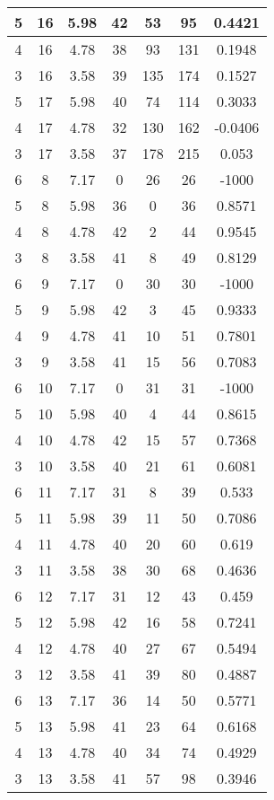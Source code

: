 \documentclass[letterpaper, 12pt]{article}
\begin{document}
\begin{longtable}{|c|c|c|c|c|c|c|}
\hline
5 & 16 & 5.98 & 42 & 53 & 95 & 0.4421 \\
\hline
4 & 16 & 4.78 & 38 & 93 & 131 & 0.1948 \\
\hline
3 & 16 & 3.58 & 39 & 135 & 174 & 0.1527 \\
\hline
5 & 17 & 5.98 & 40 & 74 & 114 & 0.3033 \\
\hline
4 & 17 & 4.78 & 32 & 130 & 162 & -0.0406 \\
\hline
3 & 17 & 3.58 & 37 & 178 & 215 & 0.053 \\
\hline
6 & 8 & 7.17 & 0 & 26 & 26 & -1000 \\
\hline
5 & 8 & 5.98 & 36 & 0 & 36 & 0.8571 \\
\hline
4 & 8 & 4.78 & 42 & 2 & 44 & 0.9545 \\
\hline
3 & 8 & 3.58 & 41 & 8 & 49 & 0.8129 \\
\hline
6 & 9 & 7.17 & 0 & 30 & 30 & -1000 \\
\hline
5 & 9 & 5.98 & 42 & 3 & 45 & 0.9333 \\
\hline
4 & 9 & 4.78 & 41 & 10 & 51 & 0.7801 \\
\hline
3 & 9 & 3.58 & 41 & 15 & 56 & 0.7083 \\
\hline
6 & 10 & 7.17 & 0 & 31 & 31 & -1000 \\
\hline
5 & 10 & 5.98 & 40 & 4 & 44 & 0.8615 \\
\hline
4 & 10 & 4.78 & 42 & 15 & 57 & 0.7368 \\
\hline
3 & 10 & 3.58 & 40 & 21 & 61 & 0.6081 \\
\hline
6 & 11 & 7.17 & 31 & 8 & 39 & 0.533 \\
\hline
5 & 11 & 5.98 & 39 & 11 & 50 & 0.7086 \\
\hline
4 & 11 & 4.78 & 40 & 20 & 60 & 0.619 \\
\hline
3 & 11 & 3.58 & 38 & 30 & 68 & 0.4636 \\
\hline
6 & 12 & 7.17 & 31 & 12 & 43 & 0.459 \\
\hline
5 & 12 & 5.98 & 42 & 16 & 58 & 0.7241 \\
\hline
4 & 12 & 4.78 & 40 & 27 & 67 & 0.5494 \\
\hline
3 & 12 & 3.58 & 41 & 39 & 80 & 0.4887 \\
\hline
6 & 13 & 7.17 & 36 & 14 & 50 & 0.5771 \\
\hline
5 & 13 & 5.98 & 41 & 23 & 64 & 0.6168 \\
\hline
4 & 13 & 4.78 & 40 & 34 & 74 & 0.4929 \\
\hline
3 & 13 & 3.58 & 41 & 57 & 98 & 0.3946 \\

\end{longtable}
\end{document}
